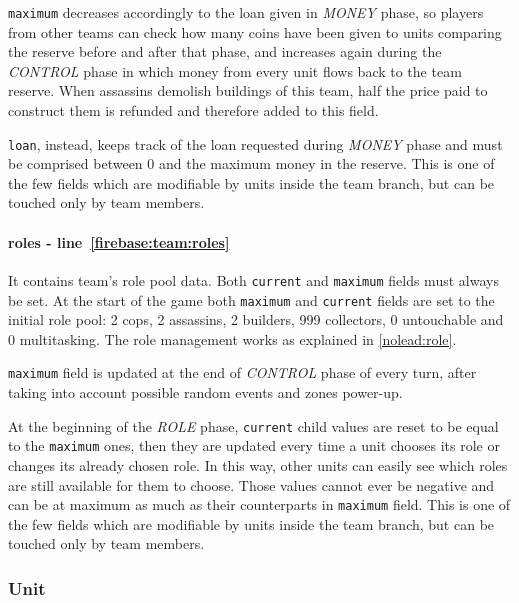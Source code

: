 				\lstinline|maximum| decreases accordingly to the loan given in \emph{MONEY} phase, so players from other teams can check how many coins have been given to units comparing the reserve before and after that phase, and increases again during the \emph{CONTROL} phase in which money from every unit flows back to the team reserve.
				When assassins demolish buildings of this team, half the price paid to construct them is refunded and therefore added to this field.
				
				\lstinline|loan|, instead, keeps track of the loan requested during \emph{MONEY} phase and must be comprised between 0 and the maximum money in the reserve. This is one of the few fields which are modifiable by units inside the team branch, but can be touched only by team members.
				
				\paragraph{roles - line~\ref{firebase:team:roles}}
				It contains team's role pool data. Both \lstinline|current| and \lstinline|maximum| fields must always be set. At the start of the game both \lstinline|maximum| and \lstinline|current| fields are set to the initial role pool: 2 cops, 2 assassins, 2 builders, 999 collectors, 0 untouchable and 0 multitasking.
				The role management works as explained in \autoref{nolead:role}.
				
				\lstinline|maximum| field is updated at the end of \emph{CONTROL} phase of every turn, after taking into account possible random events and zones power-up.
				
				At the beginning of the \emph{ROLE} phase, \lstinline|current| child values are reset to be equal to the \lstinline|maximum| ones, then they are updated every time a unit chooses its role or changes its already chosen role. In this way, other units can easily see which roles are still available for them to choose.
				Those values cannot ever be negative and can be at maximum as much as their counterparts in \lstinline|maximum| field.
				This is one of the few fields which are modifiable by units inside the team branch, but can be touched only by team members.
			
			\subsubsection{Unit}
			
				
			
